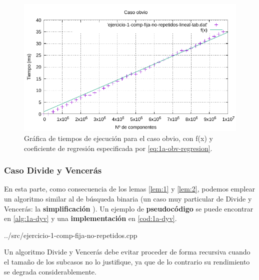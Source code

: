 \begin{figure}
	\centering
	\includegraphics[scale=0.76]{img/e1a-obv}
	\caption{Gráfica de tiempos de ejecución para el caso obvio, 
		con f(x) y coeficiente de regresión especificada por \ref{eq:1a-obv-regresion}.}
	\label{fig:1a-obv-graph}
\end{figure}

\newpage

\subsubsection{Caso Divide y Vencerás} \label{sec:1a-dyv}

En esta parte, como consecuencia de los lemas \ref{lem:1} y \ref{lem:2}, podemos emplear un 
algoritmo similar al de búsqueda binaria (un caso muy particular de Divide y Vencerás: la
\textbf{simplificación} \cite{Verdegay2017}). Un ejemplo de \textbf{pseudocódigo} se puede encontrar en \ref{alg:1a-dyv} y
una \textbf{implementación} en \ref{cod:1a-dyv}.






{../src/ejercicio-1-comp-fija-no-repetidos.cpp} 


Un algoritmo Divide y Vencerás debe evitar proceder de forma recursiva cuando el tamaño de los subcasos no lo justifique, ya que
de lo contrario su rendimiento se degrada considerablemente. 

